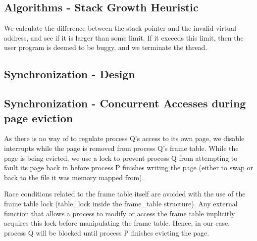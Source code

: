 
\subsection{Algorithms - Stack Growth Heuristic}


We calculate the difference between the stack pointer and the invalid virtual
address, and see if it is larger than some limit. If it exceeds this limit, then
the user program is deemed to be buggy, and we terminate the thread.

\subsection{Synchronization - Design}


\subsection{Synchronization - Concurrent Accesses during page eviction}

As there is no way of to regulate process Q's access to its own page, we disable interrupts while the page is removed from process Q's frame table.
While the page is being evicted, we use a lock to prevent process Q from attempting to fault its page back in before process P finishes writing the page (either to swap or back to the file it was memory mapped from).

Race conditions related to the frame table itself are avoided with the use of the frame table lock (table_lock inside the frame_table structure).
Any external function that allows a process to modify or access the frame table implicitly acquires this lock before manipulating the frame table.
Hence, in our case, process Q will be blocked until process P finishes evicting the page.

